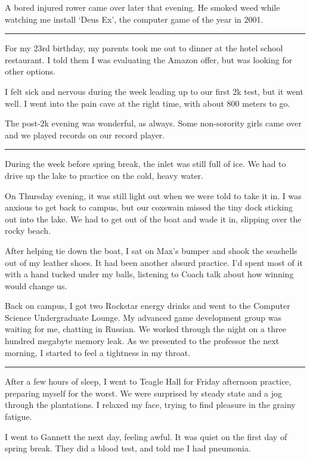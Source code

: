 A bored injured rower came over later that evening.  He smoked weed while
watching me install `Deus Ex', the computer game of the year in 2001. 

\plainfancybreak{12pt}{2}{}

For my 23rd birthday, my parents took me out to dinner at the hotel school
restaurant.  I told them I was evaluating the Amazon offer, but was looking for
other options.

I felt sick and nervous during the week leading up to our first 2k test, but it
went well.  I went into the pain cave at the right time, with about 800 meters
to go.  

The post-2k evening was wonderful, as always.  Some non-sorority girls came over
and we played records on our record player.  

\plainfancybreak{12pt}{2}{}

During the week before spring break, the inlet was still full of ice.  We had to
drive up the lake to practice on the cold, heavy water. 

On Thursday evening, it was still light out when we were told to take it in.  I
was anxious to get back to campus, but our coxswain missed the tiny dock
sticking out into the lake.  We had to get out of the boat and wade it in,
slipping over the rocky beach.

After helping tie down the boat, I sat on Max's bumper and shook the seashells
out of my leather shoes.  It had been another absurd practice.  I'd spent most
of it with a hand tucked under my balls, listening to Coach talk about how
winning would change us.  

Back on campus, I got two Rockstar energy drinks and went to the Computer
Science Undergraduate Lounge.  My advanced game development group was waiting
for me, chatting in Russian.  We worked through the night on a three hundred
megabyte memory leak.  As we presented to the professor the next morning, I
started to feel a tightness in my throat.

\plainfancybreak{12pt}{2}{}

After a few hours of sleep, I went to Teagle Hall for Friday afternoon practice,
preparing myself for the worst.  We were surprised by steady state and a jog
through the plantations.  I relaxed my face, trying to find pleasure in the
grainy fatigue.

I went to Gannett the next day, feeling awful.  It was quiet on the first day of
spring break.  They did a blood test, and told me I had pneumonia.

